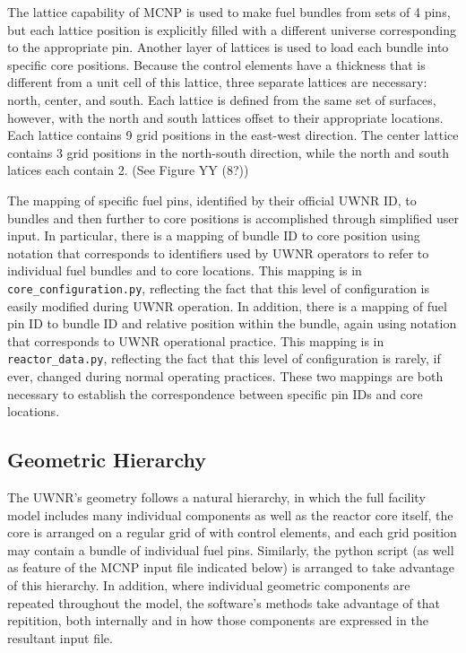 \documentclass{UWNR_modeling}
\begin{document}
The lattice capability of MCNP is used to make fuel bundles from sets of 4 pins, but each lattice position is explicitly filled with a different universe corresponding to the appropriate pin.  Another layer of lattices is used to load each bundle into specific core positions.  Because the control elements have a thickness that is different from a unit cell of this lattice, three separate lattices are necessary: north, center, and south.  Each lattice is defined from the same set of surfaces, however, with the north and south lattices offset to their appropriate locations.  Each lattice contains 9 grid positions in the east-west direction.  The center lattice contains 3 grid positions in the north-south direction, while the north and south latices each contain 2.  (See Figure YY (8?))

The mapping of specific fuel pins, identified by their official UWNR ID, to bundles and then further to core positions is accomplished through simplified user input.  In particular, there is a mapping of bundle ID to core position using notation that corresponds to identifiers used by UWNR operators to refer to individual fuel bundles and to core locations.  This mapping is in \texttt{core\_configuration.py}, reflecting the fact that this level of configuration is easily modified during UWNR operation. In addition, there is a mapping of fuel pin ID to bundle ID and relative position within the bundle, again using notation that corresponds to UWNR operational practice.  This mapping is in \texttt{reactor\_data.py}, reflecting the fact that this level of configuration is rarely, if ever, changed during normal operating practices.  These two mappings are both necessary to establish the correspondence between specific pin IDs and core locations.


\subsection{Geometric Hierarchy}\label{ssection:geom_hier}

The UWNR's geometry follows a natural hierarchy, in which the full facility model includes many individual components as well as the reactor core itself, the core is arranged on a regular grid of with control elements, and each grid position may contain a bundle of individual fuel pins.  Similarly, the python script (as well as feature of the MCNP input file indicated below) is arranged to take advantage of this hierarchy.  In addition, where individual geometric components are repeated throughout the model, the software's methods take advantage of that repitition, both internally and in how those components are expressed in the resultant input file.
\end{document}
